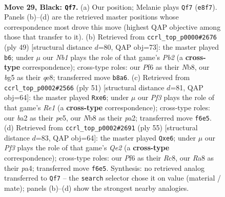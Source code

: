 \documentclass[11pt]{article}
\begin{document}
\clearpage

\begin{figure}[p]\centering
\begin{subfigure}{0.46\textwidth}\centering
\resizebox{\linewidth}{!}{%
\newchessgame
\chessboard[
  setfen={rn1rqk2/pp4pQ/5p2/2P1P1B1/8/P5P1/BP3P2/2R1R1K1 b - - 2 29},
  showmover=false,
  pgfstyle=straightmove, color=movearrow, markmove={e8-f7}
]}
\caption{}
\end{subfigure}\hfill
\begin{subfigure}{0.46\textwidth}\centering
\resizebox{\linewidth}{!}{%
\newchessgame
\chessboard[
  setfen={rn2Q3/pp2p1k1/3p4/4r1Bp/4q2P/2P5/PP2p1P1/R3R1K1 b - - 2 25},
  showmover=false,
  pgfstyle=straightmove, color=movearrow, markmove={b7-b6}
]}
\caption{}
\end{subfigure}
\\[4pt]
\begin{subfigure}{0.46\textwidth}\centering
\resizebox{\linewidth}{!}{%
\newchessgame
\chessboard[
  setfen={3rr1k1/1p3p1p/p1p1B3/4P1q1/8/7P/PPQ3P1/4RRK1 b - - 0 26},
  showmover=false,
  pgfstyle=straightmove, color=movearrow, markmove={e8-e6}
]}
\caption{}
\end{subfigure}\hfill
\begin{subfigure}{0.46\textwidth}\centering
\resizebox{\linewidth}{!}{%
\newchessgame
\chessboard[
  setfen={1rr3k1/4qpp1/4B3/4p3/Pp2P2P/4Q3/P1P5/1K1R3R b - - 0 28},
  showmover=false,
  pgfstyle=straightmove, color=movearrow, markmove={e7-e6}
]}
\caption{}
\end{subfigure}
\caption{\textbf{Move 29, Black: \texttt{Qf7}.} (a) Our position; Melanie plays \texttt{Qf7} (\texttt{e8f7}). Panels (b)--(d) are the retrieved master positions whose correspondence most drove this move (highest QAP objective among those that transfer to it). (b) Retrieved from \texttt{ccrl\_top\_p0000\#2676} (ply 49) [structural distance $d$=80, QAP obj=73]: the master played \texttt{b6}; under $\mu$ our \emph{Nb1} plays the role of that game's \emph{Pb2} (a \textbf{cross-type} correspondence); cross-type roles: our \emph{P}f6 as their \emph{N}b8, our \emph{b}g5 as their \emph{q}e8; transferred move \texttt{b8a6}. (c) Retrieved from \texttt{ccrl\_top\_p0002\#2566} (ply 51) [structural distance $d$=81, QAP obj=64]: the master played \texttt{Rxe6}; under $\mu$ our \emph{Pf3} plays the role of that game's \emph{Re1} (a \textbf{cross-type} correspondence); cross-type roles: our \emph{b}a2 as their \emph{p}e5, our \emph{N}b8 as their \emph{p}a2; transferred move \texttt{f6e5}. (d) Retrieved from \texttt{ccrl\_top\_p0002\#2691} (ply 55) [structural distance $d$=83, QAP obj=64]: the master played \texttt{Qxe6}; under $\mu$ our \emph{Pf3} plays the role of that game's \emph{Qe2} (a \textbf{cross-type} correspondence); cross-type roles: our \emph{P}f6 as their \emph{R}c8, our \emph{R}a8 as their \emph{p}a4; transferred move \texttt{f6e5}. Synthesis: no retrieved analog transferred to \texttt{Qf7} -- the \texttt{search} selector chose it on value (material / mate); panels (b)--(d) show the strongest nearby analogies.}
\label{fig:thought-m57}
\end{figure}
\end{document}
